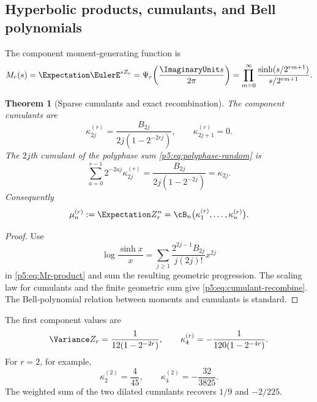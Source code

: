 \documentclass[11pt]{article}
\newtheorem{theorem}{Theorem}[section]
\theoremstyle{definition}
\theoremstyle{remark}
\begin{document}
\subsection{Hyperbolic products, cumulants, and Bell polynomials}

The component moment-generating function is
\begin{equation}
 M_r(s)=\Expectation\EulerE^{sZ_r}
 =\Psi_r\!\left(\frac{\ImaginaryUnit s}{2\pi}\right)
 =\prod_{m=0}^{\infty}
   \frac{\sinh(s/2^{rm+1})}{s/2^{rm+1}}.                   \label{p5:eq:Mr-product}
\end{equation}

\begin{theorem}[Sparse cumulants and exact recombination]
\label{p5:thm:sparse-cumulants}
The component cumulants are
\begin{equation}
 \kappa_{2j}^{(r)}
 =\frac{B_{2j}}{2j(1-2^{-2rj})},
 \qquad \kappa_{2j+1}^{(r)}=0.                             \label{p5:eq:sparse-cumulants}
\end{equation}
The $2j$th cumulant of the polyphase sum
\eqref{p5:eq:polyphase-random} is
\begin{equation}
 \sum_{a=0}^{r-1}2^{-2aj}\kappa_{2j}^{(r)}
 =\frac{B_{2j}}{2j(1-2^{-2j})}=\kappa_{2j}.                \label{p5:eq:cumulant-recombine}
\end{equation}
Consequently
\begin{equation}
 \mu_n^{(r)}:=\Expectation Z_r^n
 =\cB_n\bigl(\kappa_1^{(r)},\ldots,\kappa_n^{(r)}\bigr).   \label{p5:eq:sparse-Bell-moments}
\end{equation}
\end{theorem}

\begin{proof}
Use
\[
 \log\frac{\sinh x}{x}
 =\sum_{j\ge1}\frac{2^{2j-1}B_{2j}}{j(2j)!}x^{2j}
\]
in \eqref{p5:eq:Mr-product} and sum the resulting geometric progression.  The
scaling law for cumulants and the finite geometric sum give
\eqref{p5:eq:cumulant-recombine}.  The Bell-polynomial relation between moments
and cumulants is standard.
\end{proof}

The first component values are
\begin{equation}
 \Variance Z_r=\frac1{12(1-2^{-2r})},
 \qquad
 \kappa_4^{(r)}=-\frac1{120(1-2^{-4r})}.                   \label{p5:eq:sparse-first-cumulants}
\end{equation}
For $r=2$, for example,
\begin{equation}
 \kappa_2^{(2)}=\frac4{45},\qquad
 \kappa_4^{(2)}=-\frac{32}{3825}.                          \label{p5:eq:r2-cumulants}
\end{equation}
The weighted sum of the two dilated cumulants recovers $1/9$ and $-2/225$.
\end{document}
